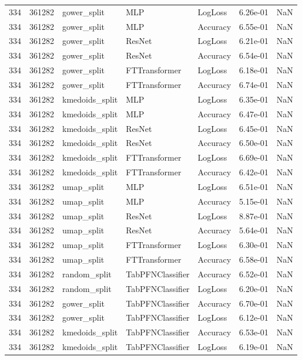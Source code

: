 \begin{tabular}{rrlllrr}
334 & 361282 & gower\_split & MLP & LogLoss & 6.26e-01 & NaN \\
334 & 361282 & gower\_split & MLP & Accuracy & 6.55e-01 & NaN \\
334 & 361282 & gower\_split & ResNet & LogLoss & 6.21e-01 & NaN \\
334 & 361282 & gower\_split & ResNet & Accuracy & 6.54e-01 & NaN \\
334 & 361282 & gower\_split & FTTransformer & LogLoss & 6.18e-01 & NaN \\
334 & 361282 & gower\_split & FTTransformer & Accuracy & 6.74e-01 & NaN \\
334 & 361282 & kmedoids\_split & MLP & LogLoss & 6.35e-01 & NaN \\
334 & 361282 & kmedoids\_split & MLP & Accuracy & 6.47e-01 & NaN \\
334 & 361282 & kmedoids\_split & ResNet & LogLoss & 6.45e-01 & NaN \\
334 & 361282 & kmedoids\_split & ResNet & Accuracy & 6.50e-01 & NaN \\
334 & 361282 & kmedoids\_split & FTTransformer & LogLoss & 6.69e-01 & NaN \\
334 & 361282 & kmedoids\_split & FTTransformer & Accuracy & 6.42e-01 & NaN \\
334 & 361282 & umap\_split & MLP & LogLoss & 6.51e-01 & NaN \\
334 & 361282 & umap\_split & MLP & Accuracy & 5.15e-01 & NaN \\
334 & 361282 & umap\_split & ResNet & LogLoss & 8.87e-01 & NaN \\
334 & 361282 & umap\_split & ResNet & Accuracy & 5.64e-01 & NaN \\
334 & 361282 & umap\_split & FTTransformer & LogLoss & 6.30e-01 & NaN \\
334 & 361282 & umap\_split & FTTransformer & Accuracy & 6.58e-01 & NaN \\
334 & 361282 & random\_split & TabPFNClassifier & Accuracy & 6.52e-01 & NaN \\
334 & 361282 & random\_split & TabPFNClassifier & LogLoss & 6.20e-01 & NaN \\
334 & 361282 & gower\_split & TabPFNClassifier & Accuracy & 6.70e-01 & NaN \\
334 & 361282 & gower\_split & TabPFNClassifier & LogLoss & 6.12e-01 & NaN \\
334 & 361282 & kmedoids\_split & TabPFNClassifier & Accuracy & 6.53e-01 & NaN \\
334 & 361282 & kmedoids\_split & TabPFNClassifier & LogLoss & 6.19e-01 & NaN \\

\end{tabular}
